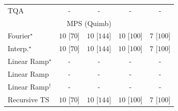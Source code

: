 \begin{tabular}{l|cccc|}
TQA & {\cellcolor[HTML]{000000}} \color[HTML]{F1F1F1} {\cellcolor{white}} \color{black} - & {\cellcolor[HTML]{000000}} \color[HTML]{F1F1F1} {\cellcolor{white}} \color{black} - & {\cellcolor[HTML]{000000}} \color[HTML]{F1F1F1} {\cellcolor{white}} \color{black} - & {\cellcolor[HTML]{000000}} \color[HTML]{F1F1F1} {\cellcolor{white}} \color{black} - \\
\cline{1-5}
\multicolumn{5}{c}{\rule{0pt}{8pt}MPS (Quimb)} \\
\midrule
Fourier$^\star$ & {\cellcolor[HTML]{00441B}} \color[HTML]{F1F1F1} $10$ [$70$] & {\cellcolor[HTML]{00441B}} \color[HTML]{F1F1F1} $10$ [$144$] & {\cellcolor[HTML]{00441B}} \color[HTML]{F1F1F1} $10$ [$100$] & {\cellcolor[HTML]{37A055}} \color[HTML]{F1F1F1} $7$ [$100$] \\
Interp.$^\star$ & {\cellcolor[HTML]{00441B}} \color[HTML]{F1F1F1} $10$ [$70$] & {\cellcolor[HTML]{00441B}} \color[HTML]{F1F1F1} $10$ [$144$] & {\cellcolor[HTML]{00441B}} \color[HTML]{F1F1F1} $10$ [$100$] & {\cellcolor[HTML]{37A055}} \color[HTML]{F1F1F1} $7$ [$100$] \\
Linear Ramp$^\star$ & {\cellcolor[HTML]{000000}} \color[HTML]{F1F1F1} {\cellcolor{white}} \color{black} - & {\cellcolor[HTML]{000000}} \color[HTML]{F1F1F1} {\cellcolor{white}} \color{black} - & {\cellcolor[HTML]{000000}} \color[HTML]{F1F1F1} {\cellcolor{white}} \color{black} - & {\cellcolor[HTML]{000000}} \color[HTML]{F1F1F1} {\cellcolor{white}} \color{black} - \\
Linear Ramp & {\cellcolor[HTML]{000000}} \color[HTML]{F1F1F1} {\cellcolor{white}} \color{black} - & {\cellcolor[HTML]{000000}} \color[HTML]{F1F1F1} {\cellcolor{white}} \color{black} - & {\cellcolor[HTML]{000000}} \color[HTML]{F1F1F1} {\cellcolor{white}} \color{black} - & {\cellcolor[HTML]{000000}} \color[HTML]{F1F1F1} {\cellcolor{white}} \color{black} - \\
Linear Ramp$^\dagger$ & {\cellcolor[HTML]{000000}} \color[HTML]{F1F1F1} {\cellcolor{white}} \color{black} - & {\cellcolor[HTML]{000000}} \color[HTML]{F1F1F1} {\cellcolor{white}} \color{black} - & {\cellcolor[HTML]{000000}} \color[HTML]{F1F1F1} {\cellcolor{white}} \color{black} - & {\cellcolor[HTML]{000000}} \color[HTML]{F1F1F1} {\cellcolor{white}} \color{black} - \\
Recursive TS & {\cellcolor[HTML]{00441B}} \color[HTML]{F1F1F1} $10$ [$70$] & {\cellcolor[HTML]{00441B}} \color[HTML]{F1F1F1} $10$ [$144$] & {\cellcolor[HTML]{00441B}} \color[HTML]{F1F1F1} $10$ [$100$] & {\cellcolor[HTML]{37A055}} \color[HTML]{F1F1F1} $7$ [$100$] \\

\end{tabular}
